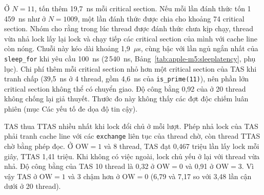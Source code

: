 Ở $N = 11$,  tốn thêm 19,7~ns mỗi critical section. Nếu mỗi lần đánh thức tốn
1\,459~ns như ở $N = 1009$, một lần đánh thức được chia cho khoảng 74 critical section. Nhóm cho rằng trong lúc thread được đánh thức chưa kịp chạy, thread vừa
nhả lock lấy lại lock và chạy tiếp các critical section của mình với cache line còn nóng. Chuỗi này kéo
dài khoảng 1,9~$\mu$s, cùng bậc với lần ngủ ngắn nhất của \texttt{sleep\_for} khi yêu cầu 100~ns
(2\,540~ns, Bảng~\ref{tab:apple-m5:sleeplatency}, phụ lục). Chi phí thêm mỗi critical section nhỏ hơn
một critical section của TAS khi tranh chấp (39,5~ns ở 4 thread, gồm 4,6~ns của
\texttt{is\_prime(11)}), nên phần lớn critical section không thể có chuyển giao. Độ công bằng 0,92 của
 ở 20 thread không chống lại giả thuyết. Thước đo này không thấy các đợt độc chiếm
luân phiên (mục Các yếu tố đe dọa độ tin cậy).

TAS thua TTAS nhiều nhất khi lock đổi chủ ở mỗi lượt. Phép nhả lock của TAS phải tranh cache line với
các \texttt{exchange} liên tục của thread chờ, còn thread TTAS chờ bằng phép đọc. Ở $\mathrm{OW} = 1$ và
8 thread, TAS đạt 0,467 triệu lần lấy lock mỗi giây, TTAS 1,41 triệu. Khi không có việc ngoài, lock chủ
yếu ở lại với thread vừa nhả. Độ công bằng của TAS 10 thread là 0,32 ở $\mathrm{OW} = 0$ và 0,91 ở
$\mathrm{OW} = 3$. Vì vậy TAS ở $\mathrm{OW} = 1$ và 3 chậm hơn ở $\mathrm{OW} = 0$ (6,79 và 7,17 so với
3,48 lần cận dưới ở 20 thread).


